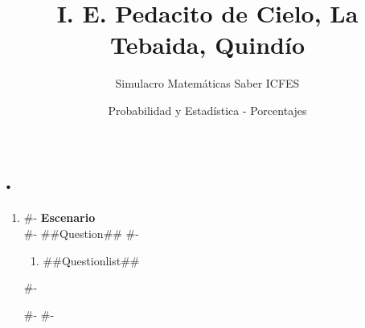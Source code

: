 \documentclass[a4paper,12pt]{article}
\title{I. E. Pedacito de Cielo, La Tebaida, Quindío}
\author{Simulacro Matemáticas Saber ICFES}
\date{Probabilidad y Estadística - Porcentajes}
\begin{document}
\maketitle

\section*{.}


\begin{enumerate}[label=\arabic*.]
#-
  \item
#-
  \textbf{Escenario}\\
#-
  ##Question##
#-
  \begin{enumerate}[label=(\alph*)]
    \item ##Questionlist##
  \end{enumerate}
#-

#-
#-
\end{enumerate}
\end{document}
